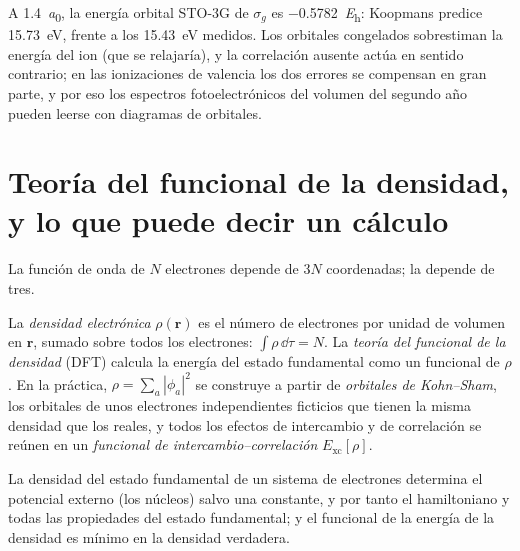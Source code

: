 \begin{example}[Ionización de \ce{H2}]\label{ex:b3:computational-chemistry:koopmans}
A \qty{1.4}{\bohr}, la energía orbital STO-3G de $\sigma_g$ es
\qty{-0.5782}{\hartree}: Koopmans predice \qty{15.73}{eV}, frente a los
\qty{15.43}{eV} medidos. Los orbitales congelados sobrestiman la energía del ion (que
se relajaría), y la correlación ausente actúa en sentido contrario; en las ionizaciones de
valencia los dos errores se compensan en gran parte, y por eso los espectros fotoelectrónicos
del volumen del segundo año pueden leerse con diagramas de orbitales.
\end{example}

\section{Teoría del funcional de la densidad, y lo que puede decir un cálculo}

La función de onda de $N$ electrones depende de $3N$ coordenadas; la
 depende de tres.

\begin{definition}\label{def:b3:computational-chemistry:dft}
La \emph{densidad electrónica} $\rho(\mathbf r)$ es el
número de electrones por unidad de volumen en $\mathbf r$, sumado sobre todos los electrones:
$\int\rho\,\dd\tau = N$. La \emph{teoría del funcional de la densidad}
(DFT) calcula la energía del estado fundamental como un funcional de $\rho$. En la
práctica, $\rho = \sum_a|\phi_a|^2$ se construye a partir de \emph{orbitales de Kohn--Sham},
los orbitales de unos electrones independientes ficticios
que tienen la misma densidad que los reales, y todos los efectos
de intercambio y de correlación se reúnen en un \emph{funcional de intercambio--correlación}
$E_{\mathrm{xc}}[\rho]$.
\end{definition}

\begin{theorem}\label{thm:b3:computational-chemistry:hohenberg-kohn}
La densidad del estado fundamental de un sistema de electrones determina el potencial
externo (los núcleos) salvo una constante, y por tanto el hamiltoniano y todas las
propiedades del estado fundamental; y el funcional de la energía de la densidad es
mínimo en la densidad verdadera.
\end{theorem}
\admitted

